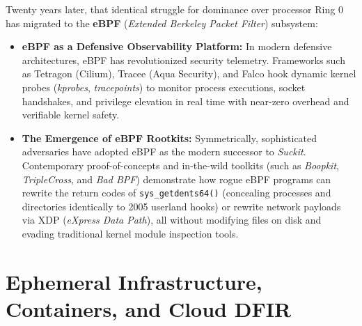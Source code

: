 Twenty years later, that identical struggle for dominance over processor Ring 0 has migrated to the \textbf{eBPF} (\textit{Extended Berkeley Packet Filter}) subsystem:
\begin{itemize}
    \item \textbf{eBPF as a Defensive Observability Platform:} In modern defensive architectures, eBPF has revolutionized security telemetry. Frameworks such as Tetragon (Cilium), Tracee (Aqua Security), and Falco hook dynamic kernel probes (\textit{kprobes}, \textit{tracepoints}) to monitor process executions, socket handshakes, and privilege elevation in real time with near-zero overhead and verifiable kernel safety.
    \item \textbf{The Emergence of eBPF Rootkits:} Symmetrically, sophisticated adversaries have adopted eBPF as the modern successor to \textit{Suckit}. Contemporary proof-of-concepts and in-the-wild toolkits (such as \textit{Boopkit}, \textit{TripleCross}, and \textit{Bad BPF}) demonstrate how rogue eBPF programs can rewrite the return codes of \texttt{sys\_getdents64()} (concealing processes and directories identically to 2005 userland hooks) or rewrite network payloads via XDP (\textit{eXpress Data Path}), all without modifying files on disk and evading traditional kernel module inspection tools.
\end{itemize}

\section{Ephemeral Infrastructure, Containers, and Cloud DFIR}

